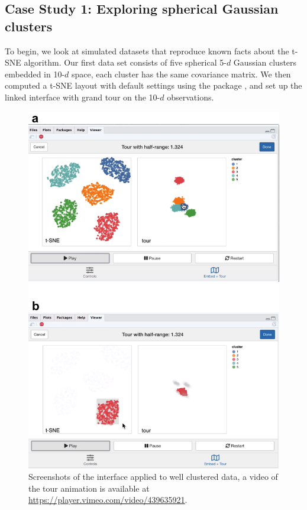 \documentclass[article,notitle]{jdssv}
\begin{document}
\hypertarget{case-study-1-exploring-spherical-gaussian-clusters}{%
\subsection{Case Study 1: Exploring spherical Gaussian clusters}\label{case-study-1-exploring-spherical-gaussian-clusters}}

To begin, we look at simulated datasets that reproduce known facts
about the t-SNE algorithm. Our first data set consists of five spherical 5-\(d\)
Gaussian clusters embedded in 10-\(d\) space, each cluster has the same
covariance matrix. We then computed a t-SNE layout with default settings
using the  package \citep{Rtsne},
and set up the  linked interface with grand tour on the 10-\(d\)
observations.



\begin{figure}

{\centering \includegraphics[width=\textwidth,height=0.75\textheight]{./img/liminal-screenshot-gaussian} 

}

\caption{Screenshots of the  interface applied to well clustered data, a video of the tour animation is available at \url{https://player.vimeo.com/video/439635921}.}\label{fig:gaussian}
\end{figure}
\end{document}
